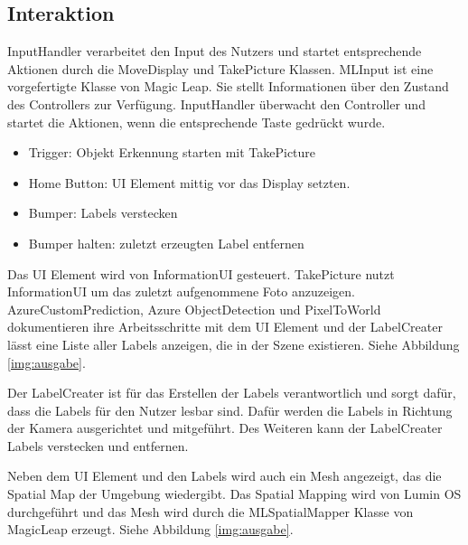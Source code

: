 \subsection{Interaktion}

InputHandler verarbeitet den Input des Nutzers und startet entsprechende Aktionen durch die MoveDisplay und TakePicture Klassen. 
MLInput ist eine vorgefertigte Klasse von Magic Leap. Sie stellt Informationen über den Zustand des Controllers zur Verfügung. InputHandler überwacht den Controller und startet die Aktionen, wenn die entsprechende Taste gedrückt wurde.

\begin{itemize}
	\item Trigger: Objekt Erkennung starten mit TakePicture
	\item Home Button: UI Element mittig vor das Display setzten.
	\item Bumper: Labels verstecken
	\item Bumper halten: zuletzt erzeugten Label entfernen 
\end{itemize}

Das UI Element wird von InformationUI gesteuert. TakePicture nutzt InformationUI um das zuletzt aufgenommene Foto anzuzeigen. AzureCustomPrediction, Azure ObjectDetection und PixelToWorld dokumentieren ihre Arbeitsschritte mit dem UI Element und der LabelCreater lässt eine Liste aller Labels anzeigen, die in der Szene existieren. Siehe Abbildung \ref{img:ausgabe}.


Der LabelCreater ist für das Erstellen der Labels verantwortlich und sorgt dafür, dass die Labels für den Nutzer lesbar sind.
Dafür werden die Labels in Richtung der Kamera ausgerichtet und mitgeführt.
Des Weiteren kann der LabelCreater Labels verstecken und entfernen.

Neben dem UI Element und den Labels wird auch ein Mesh angezeigt, das die Spatial Map der Umgebung wiedergibt. Das Spatial Mapping wird von Lumin OS durchgeführt und das Mesh wird durch die MLSpatialMapper Klasse von MagicLeap erzeugt. Siehe Abbildung \ref{img:ausgabe}.

